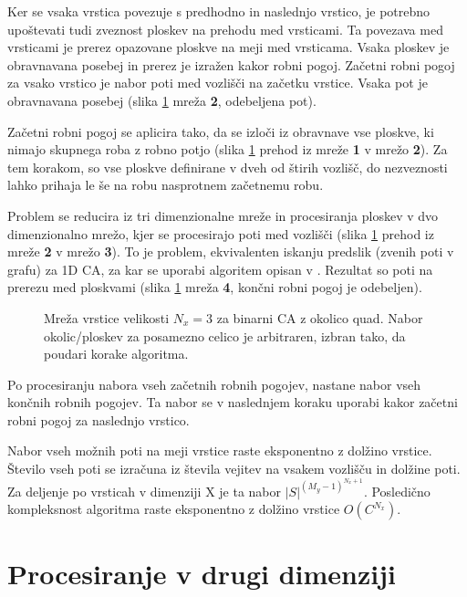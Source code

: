 \documentclass[12pt,a4paper,openany,twoside]{book}
\begin{document}
Ker se vsaka vrstica povezuje s predhodno in naslednjo vrstico, je potrebno
upoštevati tudi zveznost ploskev na prehodu med vrsticami.
Ta povezava med vrsticami je prerez opazovane ploskve na meji med vrsticama.
Vsaka ploskev je obravnavana posebej in prerez je izražen kakor robni pogoj.
Začetni robni pogoj za vsako vrstico je nabor poti med vozlišči na začetku vrstice.
Vsaka pot je obravnavana posebej (slika \ref{algorithm_line} mreža \textbf{2}, odebeljena pot).

Začetni robni pogoj se aplicira tako, da se izloči iz obravnave vse ploskve,
ki nimajo skupnega roba z robno potjo (slika \ref{algorithm_line}
prehod iz mreže \textbf{1} v mrežo \textbf{2}). Za tem korakom, so vse ploskve definirane
v dveh od štirih vozlišč, do nezveznosti lahko prihaja le še na robu nasprotnem
začetnemu robu.

Problem se reducira iz tri dimenzionalne mreže in procesiranja ploskev v
dvo dimenzionalno mrežo, kjer se procesirajo poti med vozlišči (slika \ref{algorithm_line}
prehod iz mreže \textbf{2} v mrežo \textbf{3}). To je problem, ekvivalenten iskanju predslik
(zvenih poti v grafu) za 1D CA, za kar se uporabi algoritem opisan v \cite{JerasDobnikar2007}.
Rezultat so poti na prerezu med ploskvami (slika \ref{algorithm_line} mreža \textbf{4},
končni robni pogoj je odebeljen).

\begin{figure}[htb]
\centerline{}
\caption[Algoritem procesiranja vrstice.]{Mreža vrstice velikosti \(N_x=3\) za binarni CA z okolico quad.
Nabor okolic/ploskev za posamezno celico je arbitraren, izbran tako, da poudari korake algoritma.}
\label{algorithm_line}
\end{figure}

Po procesiranju nabora vseh začetnih robnih pogojev, nastane nabor vseh končnih robnih pogojev.
Ta nabor se v naslednjem koraku uporabi kakor začetni robni pogoj za naslednjo vrstico.

Nabor vseh možnih poti na meji vrstice raste eksponentno z dolžino vrstice.
Število vseh poti se izračuna iz števila vejitev na vsakem vozlišču in dolžine poti.
Za deljenje po vrsticah v dimenziji X je ta nabor \( |S|^{(M_y-1)^{N_x+1}} \).
Posledično kompleksnost algoritma raste eksponentno z dolžino vrstice \(O(C^{N_x})\).

\section{Procesiranje v drugi dimenziji}
\end{document}
